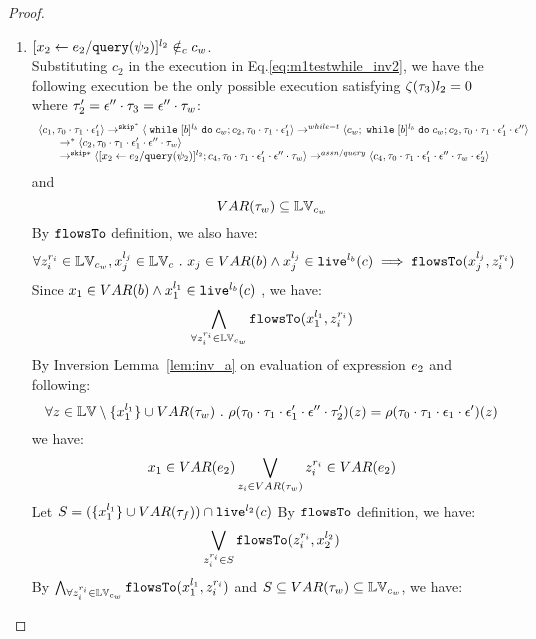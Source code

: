 {\begin{proof}
\begin{subproof}
\begin{enumerate}
\[\]
Which is contradict to $c_2 =_c [\eskip^*];[\assign{{x}_2}{\expr_2 / \query(\qexpr_2)}]^{l_2};{c}_4$ by program equality definition.
%
%
 \item $[\mathrel{ {x}_2 \leftarrow e_2 / {\tt query}(\psi_2) }]^{l_2} \notin_c c_w$.
%
\\
%
Substituting $c_2$ in the execution in Eq.\ref{eq:m1testwhile_inv2}, we have the following execution be the only possible execution satisfying $\mathtt{\zeta}(\mathtt{\tau}_3) l_2 = 0$ where $\mathtt{\tau}_2' = \mathtt{\epsilon}'' \cdot \mathtt{\tau}_3 = \mathtt{\epsilon}'' \cdot \mathtt{\tau}_w$:
\[
    \begin{array}{l}   
  \langle c_1, \mathtt{\tau}_0 \cdot \mathtt{\tau}_1 \cdot \mathtt{\epsilon}_1' \rangle 
  \rightarrow^{\mathtt{skip}^*} 
  \langle \;\mathtt{while}\; [b]^{l_b} \;\mathtt{do}\; c_w;{c}_2, \mathtt{\tau}_0 \cdot \mathtt{\tau}_1 \cdot \mathtt{\epsilon}_1' \rangle 
  \rightarrow^{while-t} 
  \langle c_w;\;\mathtt{while}\; [b]^{l_b} \;\mathtt{do}\; c_w;c_2, \mathtt{\tau}_0 \cdot \mathtt{\tau}_1 \cdot \mathtt{\epsilon}_1' \cdot \mathtt{\epsilon}'' \rangle 
  \\
  \qquad \rightarrow^{*} 
  \langle c_2,\mathtt{\tau}_0 \cdot \mathtt{\tau}_1 \cdot \mathtt{\epsilon}_1' \cdot \mathtt{\epsilon}'' \cdot \mathtt{\tau}_w \rangle
  \\
  \qquad \rightarrow^{\mathtt{skip}*} 
  \langle [\mathrel{ {x}_2 \leftarrow e_2 / {\tt query}(\psi_2) }]^{l_2};{c}_4, 
  \mathtt{\tau}_0 \cdot \mathtt{\tau}_1 \cdot \mathtt{\epsilon}_1' \cdot \mathtt{\epsilon}'' \cdot \mathtt{\tau}_w \rangle
  \rightarrow^{assn/query} 
  \langle {c}_4,  \mathtt{\tau}_0 \cdot \mathtt{\tau}_1 \cdot \mathtt{\epsilon}_1' \cdot \mathtt{\epsilon}'' \cdot \mathtt{\tau}_w \cdot \mathtt{\epsilon}_2' \rangle 
\end{array}
\]
and
\[
  VAR{(\mathtt{\tau}_w)} \subseteq \mathbb{LV}_{c_w}
\]
%
By $\mathtt{flowsTo}$ definition, we also have:
\[
  \forall z_i^{r_i} \in \mathbb{LV}_{c_w},  x_j^{l_j} \in \mathbb{LV}_c ~.~ x_j \in VAR(b) \land x_j^{l_j} \in \mathtt{live}^{l_b}(c) \implies
  \mathtt{flowsTo}(x_j^{l_j}, z_i^{r_i})
\]
Since $x_1 \in VAR(b) \land x_1^{l_1} \in \mathtt{live}^{l_b}(c)$ , we have:
\[
  \bigwedge_{\forall z_i^{r_i} \in \mathbb{LV}_{c_w}}
  \mathtt{flowsTo}(x_1^{l_1}, z_i^{r_i})
\]
%
By Inversion Lemma~\ref{lem:inv_a} on evaluation of expression $e_2$ and following: 
\[
  \forall z \in \mathbb{LV} \setminus \{x_1^{l_1}\} \cup VAR{(\mathtt{\tau}_w)} ~.~
  \rho(\mathtt{\tau}_0 \cdot \mathtt{\tau}_1 \cdot \mathtt{\epsilon}_1'\cdot \mathtt{\epsilon}'' \cdot \mathtt{\tau}_2')(z) 
  = \rho(\mathtt{\tau}_0 \cdot \mathtt{\tau}_1 \cdot \mathtt{\epsilon}_1\cdot \mathtt{\epsilon}')(z)
\]
%
we have:
\[
  x_1 \in VAR(e_2) \bigvee_{z_i \in VAR{(\mathtt{\tau}_w)}} z_i^{r_i} \in VAR(e_2)
\]
%
Let $S = (\{x_1^{l_1}\} \cup VAR{(\mathtt{\tau}_f)}) \cap \mathtt{live}^{l_2}(c) $
%
By $\mathtt{flowsTo}$ definition, we have:
\[
   \bigvee_{z_i^{r_i} \in S}  \mathtt{flowsTo}(z_i^{r_i}, x_2^{l_2})
\]
By $ \bigwedge_{\forall z_i^{r_i} \in \mathbb{LV}_{c_w}} \mathtt{flowsTo}(x_1^{l_1}, z_i^{r_i})$ and $S \subseteq VAR{(\mathtt{\tau}_w)} \subseteq \mathbb{LV}_{c_w}$, we have:

\end{enumerate}
\end{subproof}
\end{proof}}
